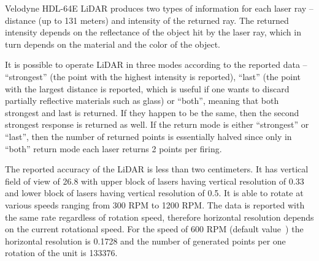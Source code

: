 Velodyne HDL-64E LiDAR produces two types of information for each laser ray -- distance (up to 131 meters) and intensity of the returned ray. The returned intensity depends on the reflectance of the object hit by the laser ray, which in turn depends on the material and the color of the object.

It is possible to operate LiDAR in three modes according to the reported data -- ``strongest'' (the point with the highest intensity is reported), ``last'' (the point with the largest distance is reported, which is useful if one wants to discard partially reflective materials such as glass) or ``both'', meaning that both strongest and last is returned. If they happen to be the same, then the second strongest response is returned as well. If the return mode is either ``strongest'' or ``last'', then the number of returned points is essentially halved since only in ``both'' return mode each laser returns 2 points per firing.

The reported accuracy of the LiDAR is less than two centimeters. It has vertical field of view of 26.8\degree{} with upper block of lasers having vertical resolution of 0.33\degree{} and lower block of lasers having vertical resolution of 0.5\degree. It is able to rotate at various speeds ranging from 300 RPM to 1200 RPM. The data is reported with the same rate regardless of rotation speed, therefore horizontal resolution depends on the current rotational speed. For the speed of 600 RPM (default value~\cite{velomanual}) the horizontal resolution is 0.1728\degree{} and the number of generated points per one rotation of the unit is 133376.

